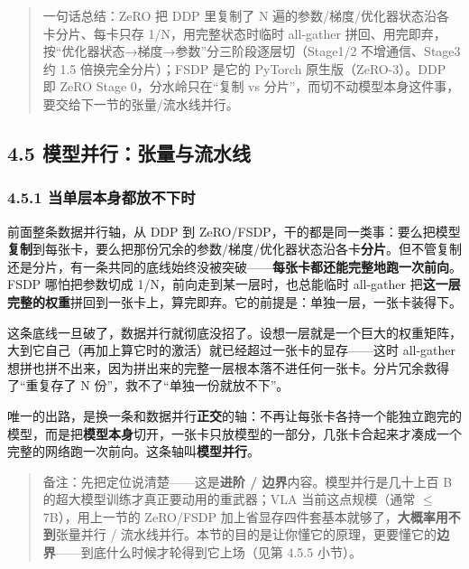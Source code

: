 \documentclass[
  chinese,
]{ctexart}
\begin{document}
\begin{quote}
一句话总结：ZeRO 把 DDP 里复制了 N
遍的参数/梯度/优化器状态沿各卡分片、每卡只存 1/N，用完整状态时临时
all-gather
拼回、用完即弃，按``优化器状态→梯度→参数''分三阶段逐层切（Stage1/2
不增通信、Stage3 约 1.5 倍换完全分片）；FSDP 是它的 PyTorch
原生版（ZeRO-3）。DDP 即 ZeRO Stage 0，分水岭只在``复制 vs
分片''，而切不动模型本身这件事，要交给下一节的张量/流水线并行。
\end{quote}

\subsection{4.5
模型并行：张量与流水线}\label{ux6a21ux578bux5e76ux884cux5f20ux91cfux4e0eux6d41ux6c34ux7ebf}

\subsubsection{4.5.1
当单层本身都放不下时}\label{ux5f53ux5355ux5c42ux672cux8eabux90fdux653eux4e0dux4e0bux65f6}

前面整条数据并行轴，从 DDP 到
ZeRO/FSDP，干的都是同一类事：要么把模型\textbf{复制}到每张卡，要么把那份冗余的参数/梯度/优化器状态沿各卡\textbf{分片}。但不管复制还是分片，有一条共同的底线始终没被突破------\textbf{每张卡都还能完整地跑一次前向}。FSDP
哪怕把参数切成 1/N，前向走到某一层时，也总能临时 all-gather
把\textbf{这一层完整的权重}拼回到一张卡上，算完即弃。它的前提是：单独一层，一张卡装得下。

这条底线一旦破了，数据并行就彻底没招了。设想一层就是一个巨大的权重矩阵，大到它自己（再加上算它时的激活）就已经超过一张卡的显存------这时
all-gather
想拼也拼不出来，因为拼出来的完整一层根本落不进任何一张卡。分片冗余救得了``重复存了
N 份''，救不了``单独一份就放不下''。

唯一的出路，是换一条和数据并行\textbf{正交}的轴：不再让每张卡各持一个能独立跑完的模型，而是把\textbf{模型本身}切开，一张卡只放模型的一部分，几张卡合起来才凑成一个完整的网络跑一次前向。这条轴叫\textbf{模型并行}。

\begin{quote}
备注：先把定位说清楚------这是\textbf{进阶 /
边界}内容。模型并行是几十上百 B 的超大模型训练才真正要动用的重武器；VLA
当前这点规模（通常 \(\le\) 7B），用上一节的 ZeRO/FSDP
加上省显存四件套基本就够了，\textbf{大概率用不到}张量并行 /
流水线并行。本节的目的是让你懂它的原理，更要懂它的\textbf{边界}------到底什么时候才轮得到它上场（见第
4.5.5 小节）。
\end{quote}
\end{document}
